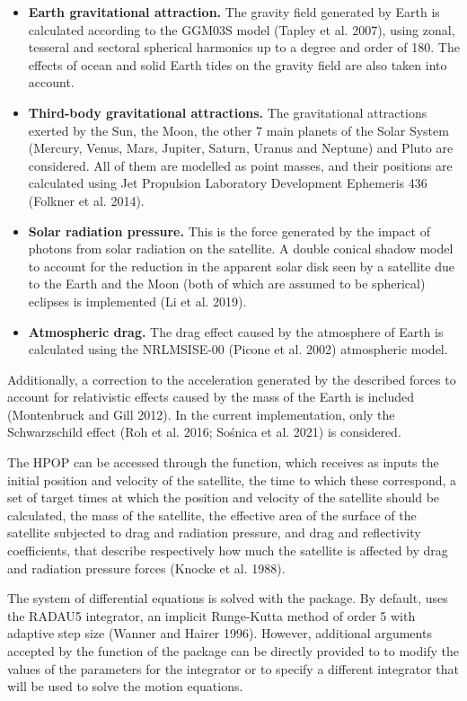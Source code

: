\begin{itemize}
\tightlist
\item
  \textbf{Earth gravitational attraction.} The gravity field generated by Earth is calculated according to the GGM03S model (Tapley et al. 2007), using zonal, tesseral and sectoral spherical harmonics up to a degree and order of 180. The effects of ocean and solid Earth tides on the gravity field are also taken into account.
\item
  \textbf{Third-body gravitational attractions.} The gravitational attractions exerted by the Sun, the Moon, the other 7 main planets of the Solar System (Mercury, Venus, Mars, Jupiter, Saturn, Uranus and Neptune) and Pluto are considered. All of them are modelled as point masses, and their positions are calculated using Jet Propulsion Laboratory Development Ephemeris 436 (Folkner et al. 2014).
\item
  \textbf{Solar radiation pressure.} This is the force generated by the impact of photons from solar radiation on the satellite. A double conical shadow model to account for the reduction in the apparent solar disk seen by a satellite due to the Earth and the Moon (both of which are assumed to be spherical) eclipses is implemented (Li et al. 2019).
\item
  \textbf{Atmospheric drag.} The drag effect caused by the atmosphere of Earth is calculated using the NRLMSISE-00 (Picone et al. 2002) atmospheric model.
\end{itemize}

Additionally, a correction to the acceleration generated by the described forces to account for relativistic effects caused by the mass of the Earth is included (Montenbruck and Gill 2012). In the current implementation, only the Schwarzschild effect (Roh et al. 2016; Sośnica et al. 2021) is considered.

The HPOP can be accessed through the  function, which receives as inputs the initial position and velocity of the satellite, the time to which these correspond, a set of target times at which the position and velocity of the satellite should be calculated, the mass of the satellite, the effective area of the surface of the satellite subjected to drag and radiation pressure, and drag and reflectivity coefficients, that describe respectively how much the satellite is affected by drag and radiation pressure forces (Knocke et al. 1988).

The system of differential equations is solved with the  package. By default,  uses the RADAU5 integrator, an implicit Runge-Kutta method of order 5 with adaptive step size (Wanner and Hairer 1996). However, additional arguments accepted by the  function of the  package can be directly provided to  to modify the values of the parameters for the integrator or to specify a different integrator that will be used to solve the motion equations.

